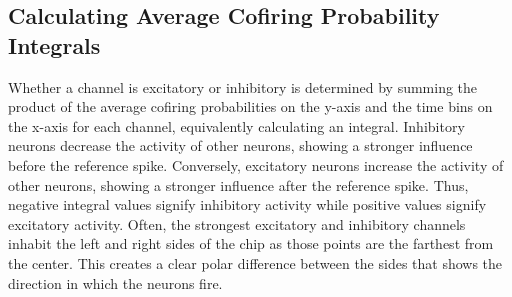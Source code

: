 \documentclass{article} %
\begin{document}
\FloatBarrier

\subsection{Calculating Average Cofiring Probability Integrals}
Whether a channel is excitatory or inhibitory is determined by summing the product of the average cofiring probabilities on the y-axis and the time bins on the x-axis for each channel, equivalently calculating an integral. Inhibitory neurons decrease the activity of other neurons, showing a stronger influence before the reference spike. Conversely, excitatory neurons increase the activity of other neurons, showing a stronger influence after the reference spike. Thus, negative integral values signify inhibitory activity while positive values signify excitatory activity. Often, the strongest excitatory and inhibitory channels inhabit the left and right sides of the chip as those points are the farthest from the center. This creates a clear polar difference between the sides that shows the direction in which the neurons fire.
\end{document}
